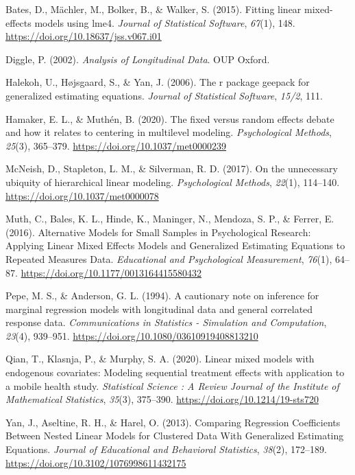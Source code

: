 \documentclass[
  12pt,
  a4paper,
]{article}
\newlength{\cslhangindent}
\newenvironment{CSLReferences}[2] %
 {\begin{list}{}{%
  \setlength{\itemindent}{0pt}
  \setlength{\leftmargin}{0pt}
  \setlength{\parsep}{0pt}
  \ifodd #1
   \setlength{\leftmargin}{\cslhangindent}
   \setlength{\itemindent}{-1\cslhangindent}
  \fi
  \setlength{\itemsep}{#2\baselineskip}}}
 {\end{list}}
\begin{document}
\label{refs}
\begin{CSLReferences}{1}{0}
Bates, D., Mächler, M., Bolker, B., \& Walker, S. (2015). Fitting linear
mixed-effects models using {lme4}. \emph{Journal of Statistical
Software}, \emph{67}(1), 148.
\url{https://doi.org/10.18637/jss.v067.i01}

Diggle, P. (2002). \emph{Analysis of Longitudinal Data}. OUP Oxford.

Halekoh, U., Højsgaard, S., \& Yan, J. (2006). The r package geepack for
generalized estimating equations. \emph{Journal of Statistical
Software}, \emph{15/2}, 111.

Hamaker, E. L., \& Muthén, B. (2020). The fixed versus random effects
debate and how it relates to centering in multilevel modeling.
\emph{Psychological Methods}, \emph{25}(3), 365--379.
\url{https://doi.org/10.1037/met0000239}

McNeish, D., Stapleton, L. M., \& Silverman, R. D. (2017). On the
unnecessary ubiquity of hierarchical linear modeling.
\emph{Psychological Methods}, \emph{22}(1), 114--140.
\url{https://doi.org/10.1037/met0000078}

Muth, C., Bales, K. L., Hinde, K., Maninger, N., Mendoza, S. P., \&
Ferrer, E. (2016). Alternative Models for Small Samples in Psychological
Research: Applying Linear Mixed Effects Models and Generalized
Estimating Equations to Repeated Measures Data. \emph{Educational and
Psychological Measurement}, \emph{76}(1), 64--87.
\url{https://doi.org/10.1177/0013164415580432}

Pepe, M. S., \& Anderson, G. L. (1994). A cautionary note on inference
for marginal regression models with longitudinal data and general
correlated response data. \emph{Communications in Statistics -
Simulation and Computation}, \emph{23}(4), 939--951.
\url{https://doi.org/10.1080/03610919408813210}

Qian, T., Klasnja, P., \& Murphy, S. A. (2020). Linear mixed models with
endogenous covariates: Modeling sequential treatment effects with
application to a mobile health study. \emph{Statistical Science : A
Review Journal of the Institute of Mathematical Statistics},
\emph{35}(3), 375--390. \url{https://doi.org/10.1214/19-sts720}

Yan, J., Aseltine, R. H., \& Harel, O. (2013). Comparing Regression
Coefficients Between Nested Linear Models for Clustered Data With
Generalized Estimating Equations. \emph{Journal of Educational and
Behavioral Statistics}, \emph{38}(2), 172--189.
\url{https://doi.org/10.3102/1076998611432175}

\end{CSLReferences}
\end{document}

